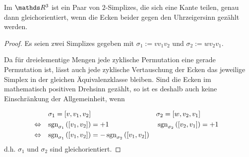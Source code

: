     \begin{folgerung}
      \label{folgOrientierungImR3}
      Im \( \R^{3} \) ist ein Paar von \( 2 \)-Simplizes, die sich eine Kante teilen, genau dann gleichorientiert, wenn die Ecken beider
      gegen den Uhrzeigersinn gezählt werden.
      \begin{proof}
        Es seien zwei Simplizes gegeben mit \( \sigma_{1} := v v_{1} v_{2} \) und \( \sigma_{2} := w v_{2}
        v_{1} \).\\
        \begin{minipage}{0.65\textwidth}
        Da für dreielementige Mengen jede zyklische Permutation eine gerade Permutation ist, lässt auch jede zyklische Vertauschung der
        Ecken das jeweilige Simplex in der gleichen Äquivalenzklasse bleiben. 
        Sind die Ecken im mathematisch positiven Drehsinn gezählt, so ist es deshalb auch keine Einschränkung der Allgemeinheit, wenn
        \end{minipage}
        \hfill
        \begin{minipage}[c]{0.3\textwidth}  
        \end{minipage}
        \begin{align}
          &&\sigma_{1} = \left[ v, v_{1}, v_{2} \right] && \sigma_{2} = \left[ w, v_{2}, v_{1} \right] \\
          & \Leftrightarrow & \mathop{\mathrm{sgn}}\nolimits_{\sigma_{1}}\left( \left[ v_{1}, v_{2} \right] \right) &= +1
                            & \mathop{\mathrm{sgn}}\nolimits_{\sigma_{2}}\left( \left[ v_{2}, v_{1} \right] \right) &= +1 \\
          & \Leftrightarrow & \mathop{\mathrm{sgn}}\nolimits_{\sigma_{1}}\left( \left[ v_{1}, v_{2} \right] \right)
                                          &= -\mathop{\mathrm{sgn}}\nolimits_{\sigma_{2}}\left( \left[ v_{1}, v_{2} \right]\right)
        \end{align}
        d.h. \( \sigma_{1} \) und \( \sigma_{2} \) sind gleichorientiert.
      \end{proof}
    \end{folgerung}


